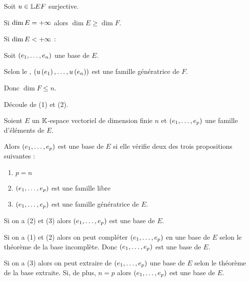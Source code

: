 \begin{dem}[2]
Soit \(u\in\mathbb{L}{E}{F}\) surjective.

Si \(\dim E=+\infty\) alors \(\dim E\geq\dim F\).

Si \(\dim E<+\infty\) :

Soit \(\left(e_1,\dots,e_n\right)\) une base de \(E\).

Selon le , \(\left(u\left(e_1\right),\dots,u\left(e_n\right)\right)\) est une famille génératrice de \(F\).

Donc \(\dim F\leq n\).
\end{dem}

\begin{dem}[3]
Découle de (1) et (2).
\end{dem}

\begin{theo}
Soient \(E\) un \(\mathbb{K}\)-espace vectoriel de dimension finie \(n\) et \(\left(e_1,\dots,e_p\right)\) une famille d'éléments de \(E\).

Alors \(\left(e_1,\dots,e_p\right)\) est une base de \(E\) si elle vérifie deux des trois propositions suivantes :

\begin{enumerate}
\item \(p=n\) \\

\item \(\left(e_1,\dots,e_p\right)\) est une famille libre \\

\item \(\left(e_1,\dots,e_p\right)\) est une famille génératrice de \(E\).
\end{enumerate}
\end{theo}

\begin{dem}
Si on a (2) et (3) alors \(\left(e_1,\dots,e_p\right)\) est une base de \(E\).

Si on a (1) et (2) alors on peut compléter \(\left(e_1,\dots,e_p\right)\) en une base de \(E\) selon le théorème de la base incomplète. Donc \(\left(e_1,\dots,e_p\right)\) est une base de \(E\).

Si on a (3) alors on peut extraire de \(\left(e_1,\dots,e_p\right)\) une base de \(E\) selon le théorème de la base extraite. Si, de plus, \(n=p\) alors \(\left(e_1,\dots,e_p\right)\) est une base de \(E\).
\end{dem}

